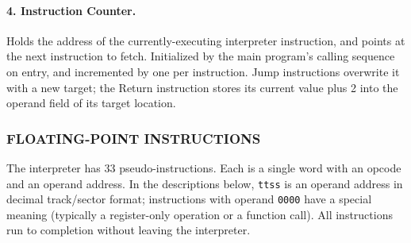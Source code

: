 \paragraph{4. Instruction Counter.} Holds the address of the currently-executing interpreter instruction, and points at the next instruction to fetch. Initialized by the main program's calling sequence on entry, and incremented by one per instruction. Jump instructions overwrite it with a new target; the Return instruction stores its current value plus 2 into the operand field of its target location.

\subsubsection*{FLOATING-POINT INSTRUCTIONS}
The interpreter has 33 pseudo-instructions. Each is a single word with an opcode and an operand address. In the descriptions below, \texttt{ttss} is an operand address in decimal track/sector format; instructions with operand \texttt{0000} have a special meaning (typically a register-only operation or a function call). All instructions run to completion without leaving the interpreter.
